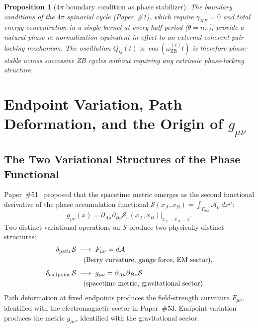 \documentclass[%
 reprint, amsmath,amssymb, aps, prd, ]{revtex4-2}
\numberwithin{equation}{section}
\newtheorem{proposition}[theorem]{Proposition}
\newcommand{\iphase}{\theta}
\newcommand{\omZBe}{\omega_{\mathrm{ZB}}^{(e)}}
\begin{document}
\begin{proposition}[$4\pi$ boundary condition as phase stabilizer]
\label{prop:phase}
The boundary conditions of the $4\pi$ spinorial cycle (Paper~\#1), which require $\gamma_{KE} = 0$ and total energy concentration in a single kernel at every half-period ($\iphase = n\pi$), provide a natural phase re-normalization equivalent in effect to an external coherent-pair locking mechanism. The oscillation $Q_{ij}(t) \propto \cos(\omZBe t)$ is therefore phase-stable across successive ZB cycles without requiring any extrinsic phase-locking structure.
\end{proposition}

\section{Endpoint Variation, Path Deformation, and the Origin of $g_{\mu\nu}$}
\label{sec:endpoint}

\subsection{The Two Variational Structures of the Phase Functional}

Paper~\#51~\cite{hanamura51} proposed that the spacetime metric emerges as the second functional derivative of the phase accumulation functional $\mathcal{S}(x_A, x_B) = \int_{\Gamma_\mathrm{ext}} \mathcal{A}_\mu\,dx^\mu$:
\begin{equation}
g_{\mu\nu}(x)
= \partial_{A\mu}\partial_{B\nu}
  \mathcal{S}_s(x_A, x_B)\big|_{x_A = x_B = x}.
\label{eq:synge_metric}
\end{equation}
Two distinct variational operations on $\mathcal{S}$ produce two physically distinct structures:
\begin{align}
\delta_\mathrm{path}\,\mathcal{S}
&\;\longrightarrow\; F_{\mu\nu} = d\mathcal{A}
\notag\\
&\quad\text{(Berry curvature, gauge force, EM sector)},
\label{eq:path_var}\\[4pt]
\delta_\mathrm{endpoint}\,\mathcal{S}
&\;\longrightarrow\; g_{\mu\nu} = \partial_{A\mu}\partial_{B\nu}\mathcal{S}
\notag\\
&\quad\text{(spacetime metric, gravitational sector)}.
\label{eq:endpoint_var}
\end{align}
Path deformation at fixed endpoints produces the field-strength curvature $F_{\mu\nu}$, identified with the electromagnetic sector in Paper~\#53.
Endpoint variation produces the metric $g_{\mu\nu}$, identified with the gravitational sector.
\end{document}
